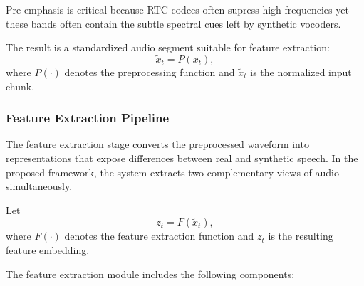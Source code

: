 Pre-emphasis is critical because RTC codecs often supress high frequencies yet these bands often contain the subtle spectral cues left by synthetic vocoders. 

The result is a standardized audio segment suitable for feature extraction:
\begin{equation}
\tilde{x}_t = P(x_t),
\end{equation}
where \(P(\cdot)\) denotes the preprocessing function and \(\tilde{x}_t\) is the normalized input chunk.

\subsubsection{Feature Extraction Pipeline}

The feature extraction stage converts the preprocessed waveform into representations that expose differences between real and synthetic speech. In the proposed framework, the system extracts two complementary views of audio simultaneously.

Let
\begin{equation}
z_t = F(\tilde{x}_t),
\end{equation}
where \(F(\cdot)\) denotes the feature extraction function and \(z_t\) is the resulting feature embedding.

The feature extraction module includes the following components:


